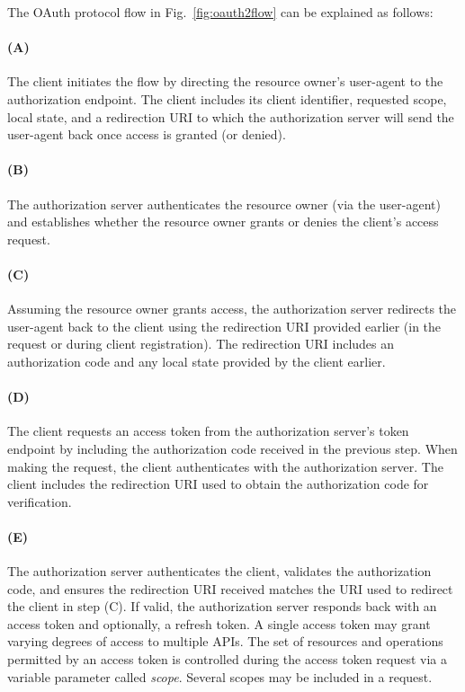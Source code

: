 \documentclass[a4paper]{llncs}
\begin{document}
The OAuth protocol flow in Fig.~\ref{fig:oauth2flow} can be explained as follows:

\paragraph*{(A)} The client initiates the flow by directing the resource owner's user-agent to the authorization endpoint. The client includes         its client identifier, requested scope, local state, and a redirection URI to which the authorization server will send the user-agent back once access is granted (or denied).

\paragraph*{(B)} The authorization server authenticates the resource owner (via the user-agent) and establishes whether the resource owner grants or denies the client's access request.

\paragraph*{(C)} Assuming the resource owner grants access, the authorization server redirects the user-agent back to the client using the redirection URI provided earlier (in the request or during client registration). The redirection URI includes an authorization code and any local state provided by the client earlier.

\paragraph*{(D)} The client requests an access token from the authorization server's token endpoint by including the authorization code received in the previous step. When making the request, the client authenticates with the authorization server. The client includes the redirection URI used to obtain the authorization code for verification.

\paragraph*{(E)} The authorization server authenticates the client, validates the authorization code, and ensures the redirection URI received matches the URI used to redirect the client in step (C). If valid, the authorization server responds back with an access token and optionally, a refresh token. A single access token may grant varying degrees of access to multiple APIs. The set of resources and operations permitted by an access token is controlled during the access token request via a variable parameter called \textit{scope}. Several scopes may be included in a request.\\
\end{document}

